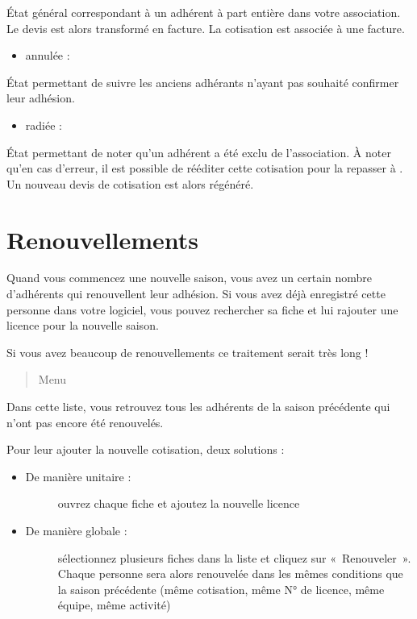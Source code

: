 \documentclass[a4paper,10pt,oneside,french]{sphinxmanual}
\begin{document}
État général correspondant à un adhérent à part entière dans votre association.
Le devis est alors transformé en facture.
La cotisation est associée à une facture.
\begin{itemize}
\item {} 
annulée :

\end{itemize}

État permettant de suivre les anciens adhérants n’ayant pas souhaité confirmer leur adhésion.
\begin{itemize}
\item {} 
radiée :

\end{itemize}

État permettant de noter qu’un adhérent a été exclu de l’association.
À noter qu’en cas d’erreur, il est possible de rééditer cette cotisation pour la repasser à . Un nouveau devis de cotisation est alors régénéré.


\section{Renouvellements}
\label{\detokenize{member/renew:renouvellements}}\label{\detokenize{member/renew::doc}}
Quand vous commencez une nouvelle saison, vous avez un certain nombre d’adhérents qui renouvellent leur adhésion. Si vous avez déjà enregistré cette personne dans votre logiciel, vous pouvez rechercher sa fiche et lui rajouter une licence pour la nouvelle saison.

Si vous avez beaucoup de renouvellements ce traitement serait très long !
\begin{quote}

Menu 
\end{quote}

Dans cette liste, vous retrouvez tous les adhérents de la saison précédente qui n’ont pas encore été renouvelés.

Pour leur ajouter la nouvelle cotisation, deux solutions :
\begin{itemize}
\item {} \begin{description}
\item[{De manière unitaire :}] \leavevmode
ouvrez chaque fiche et ajoutez la nouvelle licence

\end{description}

\item {} \begin{description}
\item[{De manière globale :}] \leavevmode
sélectionnez plusieurs fiches dans la liste et cliquez sur « Renouveler ». Chaque personne sera alors renouvelée dans les mêmes conditions que la saison précédente (même cotisation, même N° de licence, même équipe, même activité)

\end{description}

\end{itemize}
\end{document}
